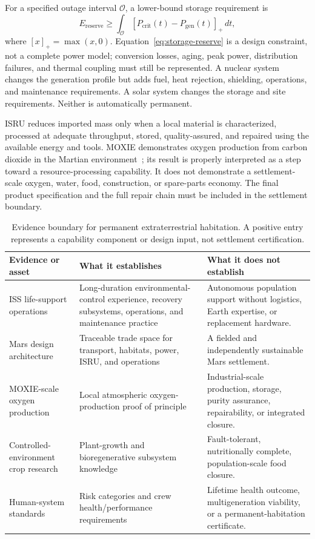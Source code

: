 \documentclass[10pt,conference]{IEEEtran}
\begin{document}
For a specified outage interval $\mathcal{O}$, a lower-bound storage requirement is
\begin{equation}
E_{\mathrm{reserve}}\geq\int_{\mathcal{O}}\left[P_{\mathrm{crit}}(t)-P_{\mathrm{gen}}(t)\right]_{+}\,dt,
\label{eq:storage-reserve}
\end{equation}
where $[x]_{+}=\max(x,0)$. Equation~\eqref{eq:storage-reserve} is a design constraint, not a complete power model; conversion losses, aging, peak power, distribution failures, and thermal coupling must still be represented. A nuclear system changes the generation profile but adds fuel, heat rejection, shielding, operations, and maintenance requirements. A solar system changes the storage and site requirements. Neither is automatically permanent.

ISRU reduces imported mass only when a local material is characterized, processed at adequate throughput, stored, quality-assured, and repaired using the available energy and tools. MOXIE demonstrates oxygen production from carbon dioxide in the Martian environment~\cite{hecht2021}; its result is properly interpreted as a step toward a resource-processing capability. It does not demonstrate a settlement-scale oxygen, water, food, construction, or spare-parts economy. The final product specification and the full repair chain must be included in the settlement boundary.

\begin{table}[!t]
\caption{Evidence boundary for permanent extraterrestrial habitation. A positive entry represents a capability component or design input, not settlement certification.}
\label{tab:evidence-boundary}
\centering
\footnotesize
\setlength{\tabcolsep}{2.5pt}
\begin{tabular}{p{}p{}p{}}
\toprule
Evidence or asset & What it establishes & What it does not establish \\
\midrule
ISS life-support operations & Long-duration environmental-control experience, recovery subsystems, operations, and maintenance practice & Autonomous population support without logistics, Earth expertise, or replacement hardware. \\
Mars design architecture~\cite{hoffmanprice2009} & Traceable trade space for transport, habitats, power, ISRU, and operations & A fielded and independently sustainable Mars settlement. \\
MOXIE-scale oxygen production~\cite{hecht2021} & Local atmospheric oxygen-production proof of principle & Industrial-scale production, storage, purity assurance, repairability, or integrated closure. \\
Controlled-environment crop research~\cite{wheeler2017} & Plant-growth and bioregenerative subsystem knowledge & Fault-tolerant, nutritionally complete, population-scale food closure. \\
Human-system standards~\cite{nasastd3001} & Risk categories and crew health/performance requirements & Lifetime health outcome, multigeneration viability, or a permanent-habitation certificate. \\
\bottomrule
\end{tabular}
\end{table}
\end{document}
